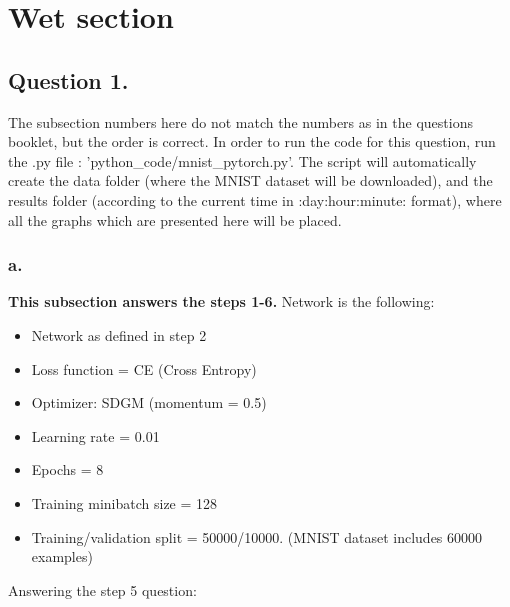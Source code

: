 \documentclass[a4paper]{iacas}
\begin{document}
\newpage



\section{Wet section}

\subsection{Question 1.}
The subsection numbers here do not match the numbers as in the questions booklet, but the order is correct. In order to run the code for this question, run the .py file :  'python\_code/mnist\_pytorch.py'.  The script will automatically create the data folder (where the MNIST dataset will be downloaded), and the results folder (according to the current time in :day:hour:minute: format), where all the graphs which are presented here will be placed.

\subsubsection{\textbf{a.}}
\textbf{This subsection answers the steps 1-6. }
\newline
Network is the following:
\begin{itemize}
\item Network as defined in step 2
\item Loss function = CE (Cross Entropy)
\item Optimizer: SDGM (momentum = 0.5)
\item Learning rate = 0.01
\item Epochs = 8
\item Training minibatch size = 128
\item Training/validation split = 50000/10000.  (MNIST dataset includes 60000 examples)
\end{itemize}

Answering the step 5 question:
\end{document}

